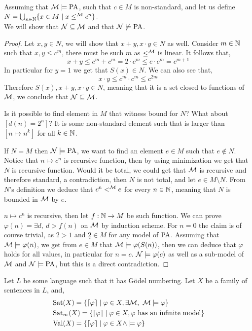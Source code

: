 \question{}
Assuming that $\mathcal{M} \models \operatorname{PA}$, such that $c \in M$ is non-standard, and let us define $N = \bigcup_{n \in \mathbb{N}} \{ x \in M \mid x \le^{\mathcal{M}} c^n \}$. \\
We will show that $\mathcal{N} \subseteq \mathcal{M}$ and that $\mathcal{N} \not\models \operatorname{PA}$.
\begin{proof}
	Let $x, y \in N$, we will show that $x + y, x \cdot y \in N$ as well.
	Consider $m \in \mathbb{N}$ such that $x, y \le c^m$, there must be such $m$ as $\le^{\mathcal{M}}$ is linear.
	It follows that,
	\[
		x + y
		\le c^m + c^m
		= 2 \cdot c^m
		\le c \cdot c^m
		= c^{m + 1}
	\]
	In particular for $y = 1$ we get that $S(x) \in N$.
	We can also see that,
	\[
		x \cdot y
		\le c^m \cdot c^m
		\le c^{2m}
	\]
	Therefore $S(x), x + y, x \cdot y \in N$, meaning that it is a set closed to functions of $\mathcal{M}$, we conclude that $\mathcal{N} \subseteq \mathcal{M}$.

	Is it possible to find element in $M$ that witness bound for $N$?
	What about $[d(n) = 2^n]$? It is some non-standard element such that is larger than $[n \mapsto n^k]$ for all $k \in \mathbb{N}$.

	If $N = M$ then $\mathcal{N} \models \operatorname{PA}$, we want to find an element $e \in M$ such that $e \notin N$.
	Notice that $n \mapsto c^n$ is recursive function, then by using minimization we get that $N$ is recursive function.
	Would it be total, we could get that $\mathcal{M}$ is recursive and therefore standard, a contradiction, then $N$ is not total, and let $e \in M \setminus N$.
	From $N$'s definition we deduce that $c^n <^{\mathcal{M}} e$ for every $n \in \mathbb{N}$, meaning that $N$ is bounded in $\mathcal{M}$ by $e$.

	$n \mapsto c^n$ is recursive, then let $f : \mathbb{N} \to M$ be such function.
	We can prove $\varphi(n) = \exists d,\ d > f(n)$ on $\mathcal{M}$ by induction scheme.
	For $n = 0$ the claim is of course trivial, as $2 > 1$ and $\underline{2} \in M$ for any model of $\operatorname{PA}$.
	Assuming that $\mathcal{M} \models \varphi(n)$, we get from $e \in M$ that $\mathcal{M} \models \varphi(S(n))$, then we can deduce that $\varphi$ holds for all values, in particular for $n = c$.
	$\mathcal{N} \models \varphi(c)$ as well as a sub-model of $\mathcal{M}$ and $\mathcal{N} \models \operatorname{PA}$, but this is a direct contradiction.
\end{proof}

\question{}
Let $L$ be some language such that it has Gödel numbering.
Let $X$ be a family of sentences in $L$, and,
\begin{align*}
	& \operatorname{Sat}(X)
	= \{ \lceil \varphi \rceil \mid \varphi \in X, \exists \mathcal{M},\ \mathcal{M} \models \varphi \} \\
	& \operatorname{Sat}_{\infty}(X)
	= \{ \lceil \varphi \rceil \mid \varphi \in X, \varphi \text{ has an infinite model} \} \\
	& \operatorname{Val}(X)
	= \{ \lceil \varphi \rceil \mid \varphi \in X \land \models \varphi \}
\end{align*}

